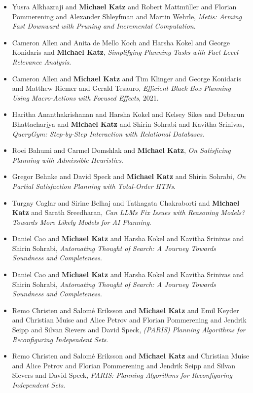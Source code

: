 \begin{itemize}[noitemsep]
\item Yusra Alkhazraji and {\bf Michael Katz} and Robert Mattmüller and Florian Pommerening and Alexander Shleyfman and Martin Wehrle, {\it Metis: Arming Fast Downward with Pruning and Incremental Computation}.
\item Cameron Allen and Anita de Mello Koch and Harsha Kokel and George Konidaris and {\bf Michael Katz}, {\it Simplifying Planning Tasks with Fact-Level Relevance Analysis}.
\item Cameron Allen and {\bf Michael Katz} and Tim Klinger and George Konidaris and Matthew Riemer and Gerald Tesauro, {\it Efficient Black-Box Planning Using Macro-Actions with Focused Effects}, 2021.
\item Haritha Ananthakrishanan and Harsha Kokel and Kelsey Sikes and Debarun Bhattacharjya and {\bf Michael Katz} and Shirin Sohrabi and Kavitha Srinivas, {\it QueryGym: Step-by-Step Interaction with Relational Databases}.
\item Roei Bahumi and Carmel Domshlak and {\bf Michael Katz}, {\it On Satisficing Planning with Admissible Heuristics}.
\item Gregor Behnke and David Speck and {\bf Michael Katz} and Shirin Sohrabi, {\it On Partial Satisfaction Planning with Total-Order HTNs}.
\item Turgay Caglar and Sirine Belhaj and Tathagata Chakraborti and {\bf Michael Katz} and Sarath Sreedharan, {\it Can LLMs Fix Issues with Reasoning Models? Towards More Likely Models for AI Planning}.
\item Daniel Cao and {\bf Michael Katz} and Harsha Kokel and Kavitha Srinivas and Shirin Sohrabi, {\it Automating Thought of Search: A Journey Towards Soundness and Completeness}.
\item Daniel Cao and {\bf Michael Katz} and Harsha Kokel and Kavitha Srinivas and Shirin Sohrabi, {\it Automating Thought of Search: A Journey Towards Soundness and Completeness}.
\item Remo Christen and Salomé Eriksson and {\bf Michael Katz} and Emil Keyder and Christian Muise and Alice Petrov and Florian Pommerening and Jendrik Seipp and Silvan Sievers and David Speck, {\it (PARIS) Planning Algorithms for Reconfiguring Independent Sets}.
\item Remo Christen and Salomé Eriksson and {\bf Michael Katz} and Christian Muise and Alice Petrov and Florian Pommerening and Jendrik Seipp and Silvan Sievers and David Speck, {\it PARIS: Planning Algorithms for Reconfiguring Independent Sets}.

\end{itemize}
